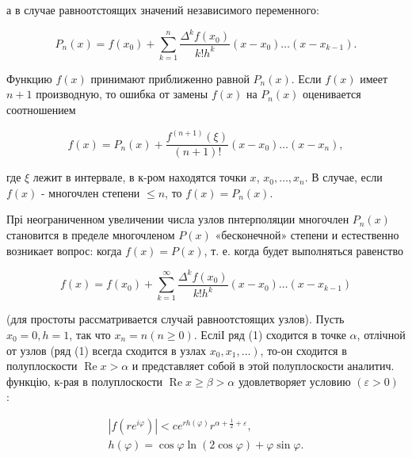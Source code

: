 \documentclass[10pt]{article}
\begin{document}
а в случае равноотстоящих значений независимого переменного:



\[

P_{n}(x)=f\left(x_{0}\right)+\sum_{k=1}^{n} \frac{\Delta^{k} f\left(x_{0}\right)}{k ! h^{k}}\left(x-x_{0}\right) \ldots\left(x-x_{k-1}\right) .

\]



Функцию $f(x)$ принимают приближенно равной $P_{n}(x)$. Если $f(x)$ имеет $n+1$ производную, то ошибка от замены $f(x)$ на $P_{n}(x)$ оценивается соотношением



\[

f(x)=P_{n}(x)+\frac{f^{(n+1)}(\xi)}{(n+1) !}\left(x-x_{0}\right) \ldots\left(x-x_{n}\right),

\]



где $\xi$ лежит в интервале, в к-ром находятся точки $x$, $x_{0}, \ldots, x_{n}$. В случае, если $f(x)$ - многочлен степени $\leqslant n$, то $f(x)=P_{n}(x)$.



Прі неограниченном увеличении числа узлов пнтерполяции многочлен $P_{n}(x)$ становится в пределе многочленом $P(x)$ «бесконечной» степени и естественно возникает вопрос: когда $f(x)=P(x)$, т. е. когда будет выполняться равенство



\[

f(x)=f\left(x_{0}\right)+\sum_{k=1}^{\infty} \frac{\Delta^{k} f\left(x_{0}\right)}{k ! h^{k}}\left(x-x_{0}\right) \ldots\left(x-x_{k-1}\right)

\]



(для простоты рассматривается случай равноотстоящих узлов). Пусть $x_{0}=0, h=1$, так что $x_{n}=n(n \geqslant 0)$. ЕсліІ ряд (1) сходится в точке $\alpha$, отлічной от узлов (ряд (1) всегда сходится в узлах $\left.x_{0}, x_{1}, \ldots\right)$, то-он сходится в полуплоскости $\operatorname{Re} x>\alpha$ и представляет собой в этой полуплоскости аналитич. функцію, к-рая в полуплоскости $\operatorname{Re} x \geqslant \beta>\alpha$ удовлетворяет условию $(\varepsilon>0)$ :



\[

\begin{gathered}

\left|f\left(r e^{i \varphi}\right)\right|<c e^{r h(\varphi)} r^{\alpha+\frac{1}{2}+\varepsilon}, \\

h(\varphi)=\cos \varphi \ln (2 \cos \varphi)+\varphi \sin \varphi .

\end{gathered}

\]
\end{document}
